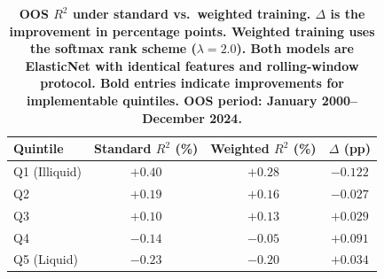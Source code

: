 \begin{table}[t!]
\centering
\begin{tabular}{l cc c}
\midrule
Quintile & Standard $R^2$ (\%) & Weighted $R^2$ (\%) & $\Delta$ (pp) \\
\midrule
Q1 (Illiquid) & $+0.40$ & $+0.28$ & $-0.122$ \\
Q2            & $+0.19$ & $+0.16$ & $-0.027$ \\
Q3            & $+0.10$ & $+0.13$ & $\mathbf{+0.029}$ \\
Q4            & $-0.14$ & $-0.05$ & $\mathbf{+0.091}$ \\
Q5 (Liquid)   & $-0.23$ & $-0.20$ & $\mathbf{+0.034}$ \\
\midrule
\end{tabular}
\caption{\footnotesize \bf OOS $R^2$ under standard vs.\ weighted training\normalfont. $\Delta$ is the improvement in percentage points. Weighted training uses the softmax rank scheme ($\lambda = 2.0$). Both models are ElasticNet with identical features and rolling-window protocol. Bold entries indicate improvements for implementable quintiles. OOS period: January 2000--December 2024.}
\label{tab:r2_weighted}
\end{table}
